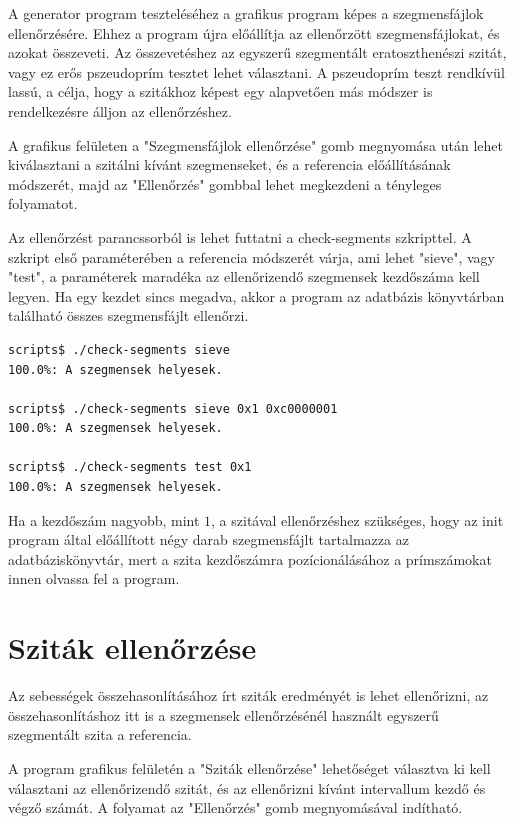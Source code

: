 A generator program teszteléséhez a grafikus program képes a szegmensfájlok ellenőrzésére.
Ehhez a program újra előállítja az ellenőrzött szegmensfájlokat, és azokat összeveti.
Az összevetéshez az egyszerű szegmentált eratoszthenészi szitát, vagy ez erős pszeudoprím tesztet lehet választani.
A pszeudoprím teszt rendkívül lassú, a célja, hogy a szitákhoz képest egy alapvetően más módszer is rendelkezésre álljon az ellenőrzéshez.

A grafikus felületen a "Szegmensfájlok ellenőrzése" gomb megnyomása után lehet kiválasztani a szitálni kívánt szegmenseket, és a referencia előállításának módszerét, majd az "Ellenőrzés" gombbal lehet megkezdeni a tényleges folyamatot.

Az ellenőrzést parancssorból is lehet futtatni a check-segments szkripttel.
A szkript első paraméterében a referencia módszerét várja, ami lehet "sieve", vagy "test", a paraméterek maradéka az ellenőrizendő szegmensek kezdőszáma kell legyen.
Ha egy kezdet sincs megadva, akkor a program az adatbázis könyvtárban található összes szegmensfájlt ellenőrzi.

\begin{lstlisting}[language=bash]
scripts$ ./check-segments sieve
100.0%: A szegmensek helyesek.             

scripts$ ./check-segments sieve 0x1 0xc0000001
100.0%: A szegmensek helyesek.             

scripts$ ./check-segments test 0x1
100.0%: A szegmensek helyesek.             

\end{lstlisting}

Ha a kezdőszám nagyobb, mint $1$, a szitával ellenőrzéshez szükséges,
hogy az init program által előállított négy darab szegmensfájlt tartalmazza
az adatbáziskönyvtár, mert a szita kezdőszámra pozícionálásához a prímszámokat
innen olvassa fel a program.

\section{Sziták ellenőrzése}

Az sebességek összehasonlításához írt sziták eredményét is lehet ellenőrizni,
az összehasonlításhoz itt is a szegmensek ellenőrzésénél használt
egyszerű szegmentált szita a referencia.

A program grafikus felületén a "Sziták ellenőrzése" lehetőséget
választva ki kell választani az ellenőrizendő szitát, és az ellenőrizni
kívánt intervallum kezdő és végző számát.
A folyamat az "Ellenőrzés" gomb megnyomásával indítható.

